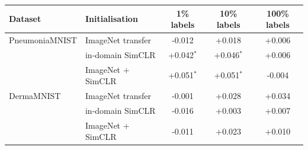 \begin{tabular}{llccc}
\toprule
Dataset & Initialisation & 1\% labels & 10\% labels & 100\% labels \\
\midrule
PneumoniaMNIST & ImageNet transfer & -0.012 & +0.018 & +0.006 \\
 & in-domain SimCLR & +0.042$^{*}$ & +0.046$^{*}$ & +0.006 \\
 & ImageNet + SimCLR & +0.051$^{*}$ & +0.051$^{*}$ & -0.004 \\
\midrule
DermaMNIST & ImageNet transfer & -0.001 & +0.028 & +0.034 \\
 & in-domain SimCLR & -0.016 & +0.003 & +0.007 \\
 & ImageNet + SimCLR & -0.011 & +0.023 & +0.010 \\
\bottomrule
\end{tabular}